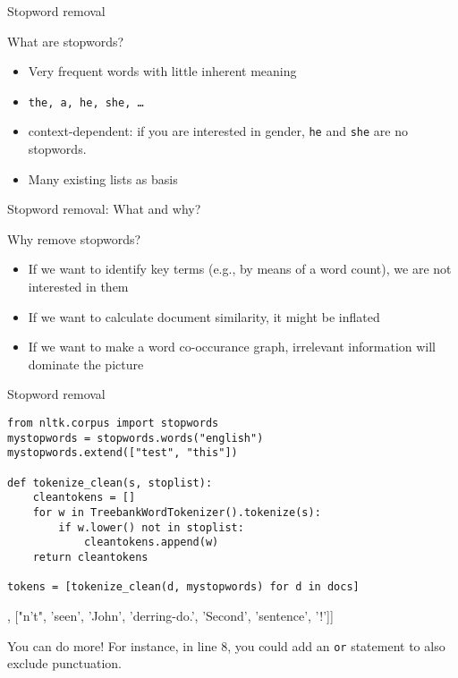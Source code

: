 \begin{frame}{Stopword removal}
	\begin{block}{What are stopwords?}
		\begin{itemize}
			\item Very frequent words with little inherent meaning
			\item \texttt{the, a, he, she, \ldots}
			\item context-dependent: if you are interested in gender, \texttt{he} and \texttt{she} are no stopwords. 
			\item Many existing lists as basis
		\end{itemize}
	\end{block}

\end{frame}


\begin{frame}{Stopword removal: What and why?}
	\begin{block}{Why remove stopwords?}
		\begin{itemize}
			\item If we want to identify key terms (e.g., by means of a word count), we are not interested in them
			\item If we want to calculate document similarity, it might be inflated
			\item If we want to make a word co-occurance graph, irrelevant information will dominate the picture
		\end{itemize}
	\end{block}
\end{frame}

\begin{frame}[fragile]{Stopword removal}
	\begin{lstlisting}
from nltk.corpus import stopwords
mystopwords = stopwords.words("english")
mystopwords.extend(["test", "this"])
		
def tokenize_clean(s, stoplist):
    cleantokens = []
    for w in TreebankWordTokenizer().tokenize(s):
        if w.lower() not in stoplist:
            cleantokens.append(w)
	return cleantokens
		
tokens = [tokenize_clean(d, mystopwords) for d in docs]
	\end{lstlisting}
	\begin{lstlistingoutputtiny}
[['text'], ["n't", 'seen', 'John', 'derring-do.', 'Second', 'sentence', '!']]
	\end{lstlistingoutputtiny}

\begin{alertblock}{You can do more!}
	\tiny{For instance, in line 8, you could add an \texttt{or} statement to also exclude punctuation.}
\end{alertblock}

\end{frame}

